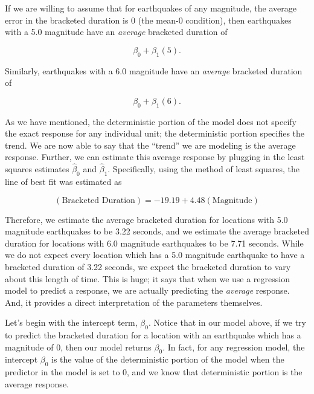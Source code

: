 \documentclass[
  letterpaper,
  DIV=11,
  numbers=noendperiod]{scrreprt}
\theoremstyle{plain}
\theoremstyle{definition}
\theoremstyle{definition}
\theoremstyle{remark}
\begin{document}
If we are willing to assume that for earthquakes of any magnitude, the
average error in the bracketed duration is 0 (the mean-0 condition),
then earthquakes with a 5.0 magnitude have an \emph{average} bracketed
duration of

\[\beta_0 + \beta_1(5).\]

Similarly, earthquakes with a 6.0 magnitude have an \emph{average}
bracketed duration of

\[\beta_0 + \beta_1(6).\]

As we have mentioned, the deterministic portion of the model does not
specify the exact response for any individual unit; the deterministic
portion specifies the trend. We are now able to say that the ``trend''
we are modeling is the average response. Further, we can estimate this
average response by plugging in the least squares estimates
\(\widehat{\beta}_0\) and \(\widehat{\beta}_1\). Specifically, using the
method of least squares, the line of best fit was estimated as

\[(\text{Bracketed Duration}) = -19.19 + 4.48 (\text{Magnitude})\]

Therefore, we estimate the average bracketed duration for locations with
5.0 magnitude earthquakes to be 3.22 seconds, and we estimate the
average bracketed duration for locations with 6.0 magnitude earthquakes
to be 7.71 seconds. While we do not expect every location which has a
5.0 magnitude earthquake to have a bracketed duration of 3.22 seconds,
we expect the bracketed duration to vary about this length of time. This
is huge; it says that when we use a regression model to predict a
response, we are actually predicting the \emph{average} response. And,
it provides a direct interpretation of the parameters themselves.

Let's begin with the intercept term, \(\beta_0\). Notice that in our
model above, if we try to predict the bracketed duration for a location
with an earthquake which has a magnitude of 0, then our model returns
\(\beta_0\). In fact, for any regression model, the intercept
\(\beta_0\) is the value of the deterministic portion of the model when
the predictor in the model is set to 0, and we know that deterministic
portion is the average response.
\end{document}
